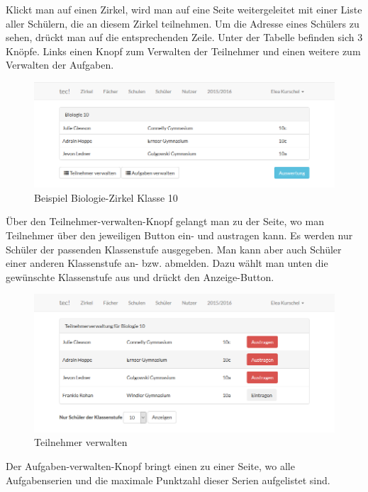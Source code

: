 Klickt man auf einen Zirkel, wird man auf eine Seite weitergeleitet mit einer Liste aller Schülern, die an diesem Zirkel teilnehmen. Um die Adresse eines Schülers zu sehen, drückt man auf die entsprechenden Zeile. Unter der Tabelle befinden sich 3 Knöpfe. Links einen Knopf zum Verwalten der Teilnehmer und einen weitere zum Verwalten der Aufgaben. 

\begin{figure}[h]
	\centering
	\includegraphics[scale=.5]{bilder/Zirkel_Biologie.png}
	\caption{Beispiel Biologie-Zirkel Klasse 10}
	\label{abb:beispiel}
\end{figure}

Über den Teilnehmer-verwalten-Knopf gelangt man zu der Seite, wo man Teilnehmer über den jeweiligen Button ein- und austragen kann. Es werden nur Schüler der passenden Klassenstufe ausgegeben. Man kann aber auch Schüler einer anderen Klassenstufe an- bzw. abmelden. Dazu wählt man unten die gewünschte Klassenstufe aus und drückt den Anzeige-Button. 

\begin{figure}[h]
	\centering
	\includegraphics[scale=.5]{bilder/Teilnehmer_verwalten.png}
	\caption{Teilnehmer verwalten}
\end{figure}

\newpage
Der Aufgaben-verwalten-Knopf bringt einen zu einer Seite, wo alle Aufgabenserien und die maximale Punktzahl dieser Serien aufgelistet sind. 

